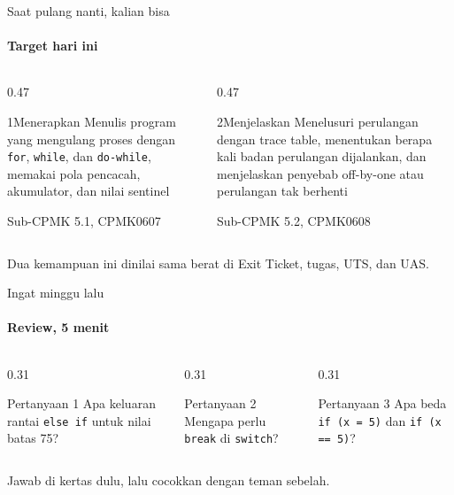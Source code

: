 \documentclass[t]{beamer}
\begin{document}
\begin{frame}{Saat pulang nanti, kalian bisa}
\framesubtitle{Target hari ini}
\begin{columns}[T]
\begin{column}{0.47\textwidth}
\begin{Langkah}{1}{Menerapkan}
Menulis program yang mengulang proses dengan \texttt{for}, \texttt{while}, dan \texttt{do-while}, memakai pola pencacah, akumulator, dan nilai sentinel

{\footnotesize\color{ITERAInkMuted}Sub-CPMK 5.1, CPMK0607}
\end{Langkah}
\end{column}
\begin{column}{0.47\textwidth}
\begin{Langkah}{2}{Menjelaskan}
Menelusuri perulangan dengan trace table, menentukan berapa kali badan perulangan dijalankan, dan menjelaskan penyebab off-by-one atau perulangan tak berhenti

{\footnotesize\color{ITERAInkMuted}Sub-CPMK 5.2, CPMK0608}
\end{Langkah}
\end{column}
\end{columns}
\vspace{8pt}
\begin{Catatan}
Dua kemampuan ini dinilai sama berat di Exit Ticket, tugas, UTS, dan UAS.
\end{Catatan}
\end{frame}

\begin{frame}{Ingat minggu lalu}
\framesubtitle{Review, 5 menit}
\begin{columns}[T]
\begin{column}{0.31\textwidth}
\begin{BlokGelap}{Pertanyaan 1}
Apa keluaran rantai \texttt{else if} untuk nilai batas 75?
\end{BlokGelap}
\end{column}
\begin{column}{0.31\textwidth}
\begin{BlokGelap}{Pertanyaan 2}
Mengapa perlu \texttt{break} di \texttt{switch}?
\end{BlokGelap}
\end{column}
\begin{column}{0.31\textwidth}
\begin{BlokGelap}{Pertanyaan 3}
Apa beda \texttt{if (x = 5)} dan \texttt{if (x == 5)}?
\end{BlokGelap}
\end{column}
\end{columns}
\vspace{8pt}
Jawab di kertas dulu, lalu cocokkan dengan teman sebelah.
\end{frame}
\end{document}
